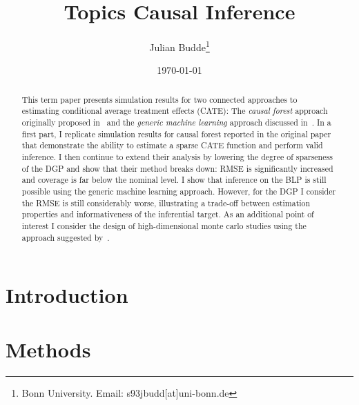 \documentclass[11pt, a4paper, leqno]{article}
\title{Topics Causal Inference}
\author{Julian Budde\thanks{Bonn University. Email: s93jbudd[at]uni-bonn.de}}
\date{
    \today
}
\begin{document}
\maketitle

\begin{abstract}
    This term paper presents simulation results for two connected approaches to estimating conditional average treatment effects (CATE):
    The \textit{causal forest} approach originally proposed in~\cite{wager2018estimation} and the \textit{generic machine learning} approach discussed in~\cite{chernozhukov2023genml}.
    In a first part, I replicate simulation results for causal forest reported in the original paper that demonstrate the ability to estimate a sparse CATE function and perform valid inference.
    I then continue to extend their analysis by lowering the degree of sparseness of the DGP and show that their method breaks down: RMSE is significantly increased and coverage is far below the nominal level.
    I show that inference on the BLP is still possible using the generic machine learning approach. However, for the DGP I consider the RMSE is still considerably worse, illustrating a trade-off between estimation properties and informativeness of the inferential target.
    As an additional point of interest I consider the design of high-dimensional monte carlo studies using the approach suggested by~\cite{athey2024wgan}.
\end{abstract}

\clearpage

\section{Introduction}

\section{Methods}
\end{document}
